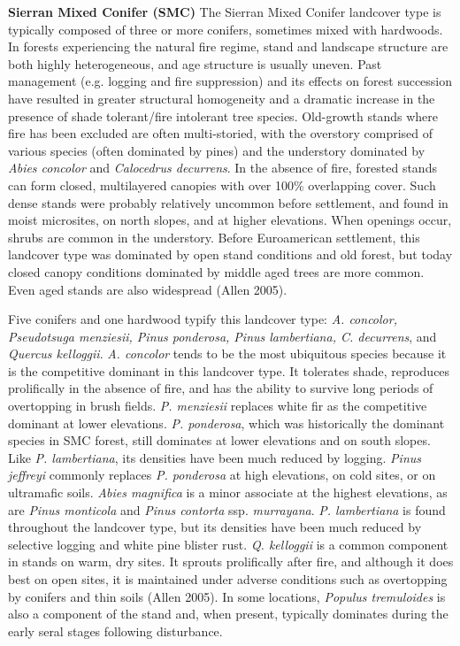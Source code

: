 \textbf{Sierran Mixed Conifer (SMC)} The Sierran Mixed Conifer landcover type is typically composed of three or more conifers, sometimes mixed with hardwoods. In forests experiencing the natural fire regime, stand and landscape structure are both highly heterogeneous, and age structure is usually uneven. Past management (e.g. logging and fire suppression) and its effects on forest succession have resulted in greater structural homogeneity and a dramatic increase in the presence of shade tolerant/fire intolerant tree species. Old-growth stands where fire has been excluded are often multi-storied, with the overstory comprised of various species (often dominated by pines) and the understory dominated by \emph{Abies concolor} and \emph{Calocedrus decurrens}. In the absence of fire, forested stands can form closed, multilayered canopies with over 100\% overlapping cover. Such dense stands were probably relatively uncommon before settlement, and found in moist microsites, on north slopes, and at higher elevations. When openings occur, shrubs are common in the understory. Before Euroamerican settlement, this landcover type was dominated by open stand conditions and old forest, but today closed canopy conditions dominated by middle aged trees are more common. Even aged stands are also widespread (Allen 2005). 

Five conifers and one hardwood typify this landcover type: \emph{A. concolor, Pseudotsuga menziesii, Pinus ponderosa, Pinus lambertiana, C. decurrens}, and \emph{Quercus kelloggii}. \emph{A. concolor} tends to be the most ubiquitous species because it is the competitive dominant in this landcover type. It tolerates shade, reproduces prolifically in the absence of fire, and has the ability to survive long periods of overtopping in brush fields. \emph{P. menziesii} replaces white fir as the competitive dominant at lower elevations. \emph{P. ponderosa}, which was historically the dominant species in SMC forest, still dominates at lower elevations and on south slopes. Like \emph{P. lambertiana}, its densities have been much reduced by logging. \emph{Pinus jeffreyi} commonly replaces \emph{P. ponderosa} at high elevations, on cold sites, or on ultramafic soils. \emph{Abies magnifica} is a minor associate at the highest elevations, as are \emph{Pinus monticola} and \emph{Pinus contorta} ssp. \emph{murrayana}. \emph{P. lambertiana} is found throughout the landcover type, but its densities have been much reduced by selective logging and white pine blister rust. \emph{Q. kelloggii} is a common component in stands on warm, dry sites. It sprouts prolifically after fire, and although it does best on open sites, it is maintained under adverse conditions such as overtopping by conifers and thin soils (Allen 2005). In some locations, \emph{Populus tremuloides} is also a component of the stand and, when present, typically dominates during the early seral stages following disturbance.

